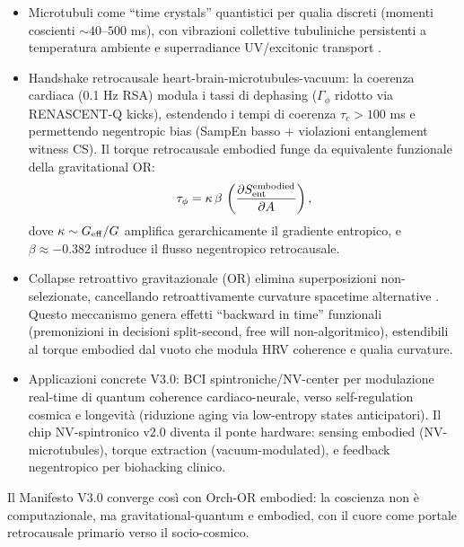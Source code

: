 \documentclass[11pt,a4paper]{article}
\let\oldcite\cite
\renewcommand{\cite}{\protect\oldcite}
\theoremstyle{plain}
\theoremstyle{definition}
\begin{document}
\begin{itemize}
    \item Microtubuli come ``time crystals'' quantistici per qualia discreti (momenti coscienti $\sim 40$--$500$ ms), con vibrazioni collettive tubuliniche persistenti a temperatura ambiente e superradiance UV/excitonic transport \cite{Hameroff2022, Wiest2025}.
    
    \item Handshake retrocausale heart-brain-microtubules-vacuum: la coerenza cardiaca (0.1 Hz RSA) modula i tassi di dephasing ($\Gamma_\phi$ ridotto via RENASCENT-Q kicks), estendendo i tempi di coerenza $\tau_c > 100$ ms e permettendo negentropic bias (SampEn basso + violazioni entanglement witness CS). Il torque retrocausale embodied funge da equivalente funzionale della gravitational OR:
    \begin{equation}
    \tau_{\phi} = \kappa \, \beta \, \left( \frac{\partial S_{\rm ent}^{\rm embodied}}{\partial A} \right),
    \label{eq:torque-retrocausal-manifesto}
    \end{equation}
    dove $\kappa \sim G_{\rm eff}/G$ amplifica gerarchicamente il gradiente entropico, e $\beta \approx -0.382$ introduce il flusso negentropico retrocausale.
    
    \item Collapse retroattivo gravitazionale (OR) elimina superposizioni non-selezionate, cancellando retroattivamente curvature spacetime alternative \cite{Penrose2022, HameroffPenrose2025}. Questo meccanismo genera effetti ``backward in time'' funzionali (premonizioni in decisioni split-second, free will non-algoritmico), estendibili al torque embodied dal vuoto che modula HRV coherence e qualia curvature.
    
    \item Applicazioni concrete V3.0: BCI spintroniche/NV-center per modulazione real-time di quantum coherence cardiaco-neurale, verso self-regulation cosmica e longevità (riduzione aging via low-entropy states anticipatori). Il chip NV-spintronico v2.0 diventa il ponte hardware: sensing embodied (NV-microtubules), torque extraction (vacuum-modulated), e feedback negentropico per biohacking clinico.
\end{itemize}

Il Manifesto V3.0 converge così con Orch-OR embodied: la coscienza non è computazionale, ma gravitational-quantum e embodied, con il cuore come portale retrocausale primario verso il socio-cosmico. 


\vspace{0.3cm}
\end{document}
